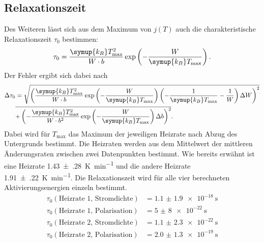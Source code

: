 \subsection{Relaxationszeit}
\label{sec:relax}
Des Weiteren lässt sich aus dem Maximum von $j(T)$ auch die charakteristische Relaxationszeit $\tau_0$
bestimmen:
\begin{equation}
    \label{eqn:tau0}
    \tau_0 = \frac{\symup{k_B}T_\text{max}^2}{W \cdot b} \exp\left(-\frac{W}{\symup{k_B}T_\text{max}} \right).
\end{equation}
Der Fehler ergibt sich dabei nach
\begin{align*}
    \label{eqn:FehlerTau}
    \Delta \tau_0 & =\sqrt{\left(\frac{\symup{k_B} T_\text{max}^2}{W \cdot b} \exp\left(-\frac{W}{\symup{k_B} T_\text{max}}\right)\left(-\frac{1}{\symup{k_B}T_\text{max}} - \frac{1}{W} \right) \Delta W \right)^2} \\
    &\overline{+ \left(-\frac{\symup{k_B} T_\text{max}^2}{W \cdot b^2} \exp\left(-\frac{W}{\symup{k_B} T_\text{max}}\right)\Delta b \right)^2}.
\end{align*}
Dabei wird für $T_\text{max}$ das Maximum der jeweiligen Heizrate nach Abzug des Untergrunds bestimmt.
Die Heizraten werden aus dem Mittelwert der mittleren Änderungsraten zwischen zwei Datenpunkten bestimmt.
Wie bereits erwähnt ist eine Heizrate \SI{1.43(28)}{\kelvin\per\minute} und die andere Heizrate \SI{1.91(22)}{\kelvin\per\minute}.
Die Relaxationszeit wird für alle vier berechneten Aktivierungsenergien einzeln bestimmt.
\begin{align*}
  \tau_0(\text{Heizrate 1, Stromdichte}) &= \SI{1.1(19)e-18}{\second} \\
  \tau_0(\text{Heizrate 1, Polarisation}) &= \SI{5(8)e-22}{\second} \\
  \tau_0(\text{Heizrate 2, Stromdichte}) &= \SI{1.1(23)e-22}{\second} \\
  \tau_0(\text{Heizrate 2, Polarisation}) &= \SI{2.0(13)e-19}{\second} \\
\end{align*}
